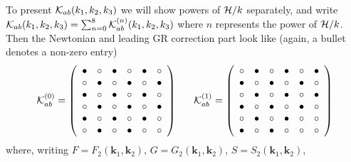 To present $\mathcal{K}_{ab}(k_1,k_2,k_3)$ we will show powers of ${\cal H}/k$ separately, and write \\$\mathcal{K}_{ab}(k_1,k_2,k_3)=\sum_{n=0}^8 \mathcal{K}_{ab}^{(n)}(k_1,k_2,k_3)$ where $n$ represents the power of ${\cal H}/k$.  Then the Newtonian and leading GR correction  part look like (again, a bullet denotes a non-zero entry)
\begin{equation}         
  \mathcal{K}_{ab}^{(0)} = \left( \begin {array}{cccccc} 
 \bullet&\circ &\bullet&\circ &\bullet&\circ \\ 
  \circ &\bullet&\circ &\bullet &\circ &\bullet\\ 
   \bullet&\circ &\bullet&\circ &\bullet&\circ \\ 
    \circ &\bullet&\circ &\bullet&\circ &\bullet\\ 
 \bullet&\circ &\bullet&\circ &\bullet&\circ \\ 
  \circ &\bullet&\circ &\bullet&\circ &\circ 
\end {array} \right)~~~~~ 
\mathcal{K}_{ab}^{(1)} = \left( \begin {array}{cccccc} 
  \circ&\bullet&\circ&\bullet&\circ&\bullet\\ \bullet&\circ&\bullet&\circ
&\bullet&\circ\\ \circ&\bullet&\circ&\bullet&\circ&\bullet\\ \bullet&\circ&\bullet&\circ&\bullet&\circ
\\ \circ&\bullet&\circ&\bullet&\circ&\circ\\ \bullet&\circ&\bullet&\circ&\circ&\circ
\end {array}
  \right)
\end{equation}
where, writing $F=F_2(\bm k_1,\bm k_2)$, $G=G_2(\bm k_1,\bm k_2)$, $S=S_2(\bm k_1,\bm k_2)$,  
